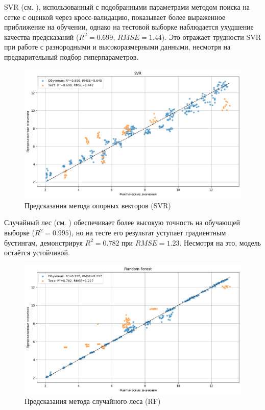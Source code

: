 SVR (см. ), использованный с подобранными параметрами методом поиска на сетке с оценкой через кросс-валидацию, показывает более выраженное приближение на обучении, однако на тестовой выборке наблюдается ухудшение качества предсказаний ($R^2 = 0.699$, $RMSE = 1.44$). Это отражает трудности SVR при работе с разнородными и высокоразмерными данными, несмотря на предварительный подбор гиперпараметров.

\begin{figure}[htbp!]
	\centering
	\includegraphics[width=.9\linewidth]{my_folder/images/coverage/SVR.png}
	\caption{Предсказания метода опорных векторов (SVR)} 
	\label{fig:coverage-svr}  
\end{figure}

Случайный лес (см. ) обеспечивает более высокую точность на обучающей выборке ($R^2 = 0.995$), но на тесте его результат уступает градиентным бустингам, демонстрируя $R^2 = 0.782$ при $RMSE = 1.23$. Несмотря на это, модель остаётся устойчивой.

\begin{figure}[htbp!]
	\centering
	\includegraphics[width=.9\linewidth]{my_folder/images/coverage/Random-Forest.png}
	\caption{Предсказания метода случайного леса (RF)} 
	\label{fig:coverage-rf}  
\end{figure}


